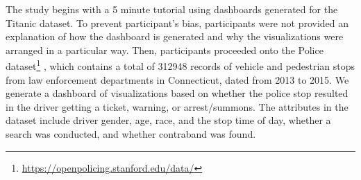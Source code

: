 \par The study begins with a 5 minute tutorial using dashboards generated for the Titanic dataset. To prevent participant's bias, participants were not provided an explanation of how the dashboard is generated and why the visualizations were arranged in a particular way. Then, participants proceeded onto the Police dataset\footnote{\url{https://openpolicing.stanford.edu/data/}} %
, which contains a total of 312948 records of vehicle and pedestrian stops from law enforcement departments in Connecticut, dated from 2013 to 2015. We generate a dashboard of visualizations based on whether the police stop resulted in the driver getting a ticket, warning, or arrest/summons. The attributes in the dataset include driver gender, age, race, and the stop time of day, whether a search was conducted, and whether contraband was found.


